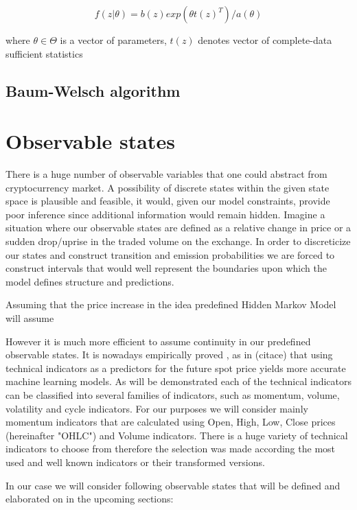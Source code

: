 \begin{equation}
f(z|\theta) = b(z) exp(\theta t(z)^T)/a(\theta)
\end{equation}

where $\theta \in \Theta$ is a vector of parameters, $t(z)$ denotes vector of complete-data sufficient statistics

\subsection{Baum-Welsch algorithm}






\section{Observable states}

	There is a huge number of observable variables that one could abstract from cryptocurrency market. A possibility of discrete states within the given state space is plausible and feasible, it would, given our model constraints, provide poor inference since additional information would remain hidden. Imagine a situation where our observable states are defined as a relative change in price or a sudden drop/uprise in the traded volume on the exchange. In order to discreticize our states and construct transition and emission probabilities we are forced to construct intervals that would well represent the boundaries upon which the model defines structure and predictions. 
	
Assuming that the price increase in   the idea predefined Hidden Markov Model will assume
	
	However it is much more efficient to assume continuity in our predefined observable states. It is nowadays empirically proved , as in (citace) that using technical indicators as a predictors for the future spot price yields more accurate machine learning models. As will be demonstrated each of the technical indicators can be classified into several families of indicators, such as momentum, volume, volatility and cycle indicators. For our purposes we will consider mainly momentum indicators that are calculated using Open, High, Low, Close prices (hereinafter "OHLC") and Volume indicators. There is a huge variety of technical indicators to choose from therefore the selection was made according the most used and well known indicators or their transformed versions. 

In our case we will consider following observable states that will be defined and elaborated on in the upcoming sections:

